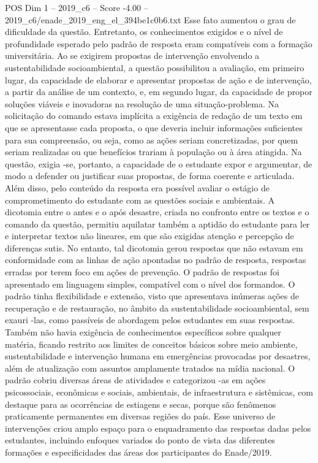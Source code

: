 \begin{textsample}{POS Dim 1 – 2019\_c6 – Score -4.00 – 2019\_c6/enade\_2019\_eng\_el\_394be1c0b6.txt}
Esse fato aumentou o grau de dificuldade da questão.
Entretanto, os conhecimentos exigidos e o nível de profundidade esperado pelo padrão de resposta eram compatíveis com a formação universitária.
Ao se exigirem propostas de intervenção envolvendo a sustentabilidade socioambiental, a questão possibilitou a avaliação, em primeiro lugar, da capacidade de elaborar e apresentar propostas de ação e de intervenção, a partir da análise de um contexto, e, em segundo lugar, da capacidade de propor soluções viáveis e inovadoras na resolução de uma situação-problema.
Na solicitação do comando estava implícita a exigência de redação de um texto em que se apresentasse cada proposta, o que deveria incluir informações suficientes para sua compreensão, ou seja, como as ações seriam concretizadas, por quem seriam realizadas ou que benefícios trariam à população ou à área atingida.
Na questão, exigia -se, portanto, a capacidade de o estudante expor e argumentar, de modo a defender ou justificar suas propostas, de forma coerente e articulada.
Além disso, pelo conteúdo da resposta era possível avaliar o estágio de comprometimento do estudante com as questões sociais e ambientais.
A dicotomia entre o antes e o após desastre, criada no confronto entre os textos e o comando da questão, permitiu aquilatar também a aptidão do estudante para ler e interpretar textos não lineares, em que são exigidas atenção e percepção de diferenças sutis.
No entanto, tal dicotomia gerou respostas que não estavam em conformidade com as linhas de ação apontadas no padrão de resposta, respostas erradas por terem foco em ações de prevenção.
O padrão de respostas foi apresentado em linguagem simples, compatível com o nível dos formandos.
O padrão tinha flexibilidade e extensão, visto que apresentava inúmeras ações de recuperação e de restauração, no âmbito da sustentabilidade socioambiental, sem exauri -las, como passíveis de abordagem pelos estudantes em suas respostas.
Também não havia exigência de conhecimentos específicos sobre qualquer matéria, ficando restrito aos limites de conceitos básicos sobre meio ambiente, sustentabilidade e intervenção humana em emergências provocadas por desastres, além de atualização com assuntos amplamente tratados na mídia nacional.
O padrão cobriu diversas áreas de atividades e categorizou -as em ações psicossociais, econômicas e sociais, ambientais, de infraestrutura e sistêmicas, com destaque para as ocorrências de estiagens e secas, porque são fenômenos praticamente permanentes em diversas regiões do país.
Esse universo de intervenções criou amplo espaço para o enquadramento das respostas dadas pelos estudantes, incluindo enfoques variados do ponto de vista das diferentes formações e especificidades das áreas dos participantes do Enade/2019.

\end{textsample}
